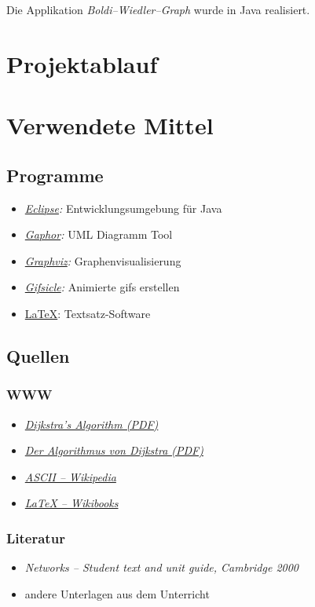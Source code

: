 \documentclass[a4paper,titlepage]{article}
\begin{document}
Die Applikation \emph{Boldi--Wiedler--Graph} wurde in Java realisiert.

\newpage

\section{Projektablauf}

\newpage

\section{Verwendete Mittel}

\subsection{Programme}

\begin{itemize}
\item \emph{\href{http://www.eclipse.org}{Eclipse}:} Entwicklungsumgebung für Java
\item \emph{\href{http://gaphor.sourceforge.net}{Gaphor}:} UML Diagramm Tool
\item \emph{\href{http://graphviz.org}{Graphviz}:} Graphenvisualisierung
\item \emph{\href{http://www.lcdf.org/gifsicle}{Gifsicle}:} Animierte gifs erstellen
\item \href{http://www.latex-project.org}{\LaTeX}: Textsatz-Software
\end{itemize}

\subsection{Quellen}

\subsubsection{WWW}

\begin{itemize}
\item \emph{\href{http://ocw.mit.edu/NR/rdonlyres/Sloan-School-of-Management/15-082JNetwork-OptimizationSpring2003/FC13EFA1-0FE2-4BFB-B019-8939606EDDCC/0/dijkstrasalgorithm.pdf}{Dijkstra’s Algorithm (PDF)}}
\item \emph{\href{http://www.educ.ethz.ch/lehrpersonen/informatik/unterrichtsmaterialien_inf/kommuniation_kryptographie/routing/la3.pdf}{Der Algorithmus von Dijkstra (PDF)}}
\item \emph{\href{http://en.wikipedia.org/wiki/ASCII}{ASCII -- Wikipedia}}
\item \emph{\href{http://en.wikibooks.org/wiki/LaTeX}{LaTeX -- Wikibooks}}
\end{itemize}

\subsubsection{Literatur}
\begin{itemize}
\item \emph{Networks -- Student text and unit guide, Cambridge 2000}
\item andere Unterlagen aus dem Unterricht
\end{itemize}
\end{document}
